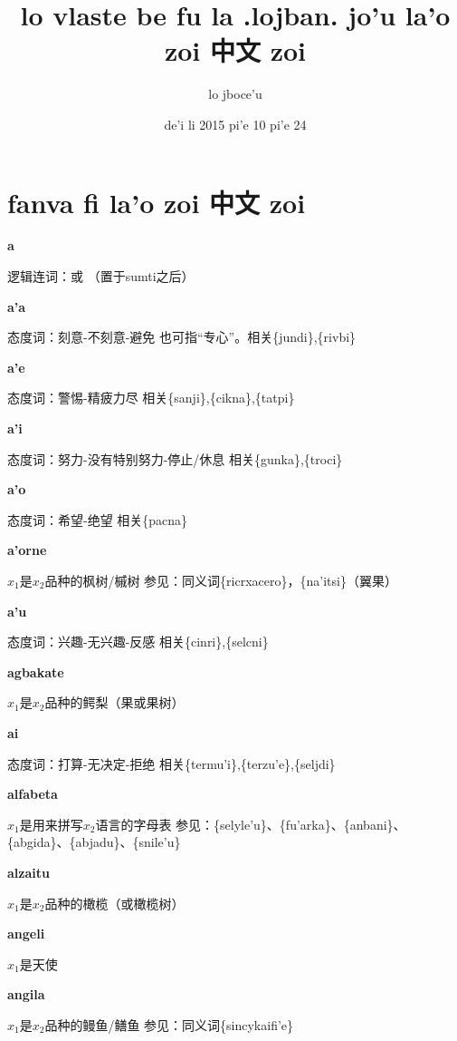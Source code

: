 \documentclass[notitlepage,twocolumn,a4paper,10pt]{book}
\title{lo vlaste be fu la .lojban. jo'u la'o zoi 中文 zoi}
\author{lo jboce'u}
\date{de'i li 2015 pi'e 10 pi'e 24}
\begin{document}
\maketitle

\chapter{fanva fi la'o zoi 中文 zoi}

{\sffamily\bfseries a}\enspace {\sffamily\bfseries[A]}  逻辑连词：或 （置于sumti之后）

{\sffamily\bfseries a'a}\enspace {\sffamily\bfseries[UI1]}  态度词：刻意-不刻意-避免 \textemdash{} 也可指“专心”。相关\{jundi\},\{rivbi\}

{\sffamily\bfseries a'e}\enspace {\sffamily\bfseries[UI1]}  态度词：警惕-精疲力尽 \textemdash{} 相关\{sanji\},\{cikna\},\{tatpi\}

{\sffamily\bfseries a'i}\enspace {\sffamily\bfseries[UI1]}  态度词：努力-没有特别努力-停止\slash{}休息 \textemdash{} 相关\{gunka\},\{troci\}

{\sffamily\bfseries a'o}\enspace {\sffamily\bfseries[UI1]}  态度词：希望-绝望 \textemdash{} 相关\{pacna\}

{\sffamily\bfseries a'orne} $x_1$是$x_2$品种的枫树\slash{}槭树 \textemdash{} 参见：同义词\{ricrxacero\}，\{na'itsi\}（翼果）

{\sffamily\bfseries a'u}\enspace {\sffamily\bfseries[UI1]}  态度词：兴趣-无兴趣-反感 \textemdash{} 相关\{cinri\},\{selcni\}

{\sffamily\bfseries agbakate} $x_1$是$x_2$品种的鳄梨（果或果树）

{\sffamily\bfseries ai}\enspace {\sffamily\bfseries[UI1]}  态度词：打算-无决定-拒绝 \textemdash{} 相关\{termu'i\},\{terzu'e\},\{seljdi\}

{\sffamily\bfseries alfabeta} $x_1$是用来拼写$x_2$语言的字母表 \textemdash{} 参见：\{selyle'u\}、\{fu'arka\}、\{anbani\}、\{abgida\}、\{abjadu\}、\{snile'u\}

{\sffamily\bfseries alzaitu} $x_1$是$x_2$品种的橄榄（或橄榄树）

{\sffamily\bfseries angeli} $x_1$是天使

{\sffamily\bfseries angila} $x_1$是$x_2$品种的鳗鱼\slash{}鳝鱼 \textemdash{} 参见：同义词\{sincykaifi'e\}
\end{document}
